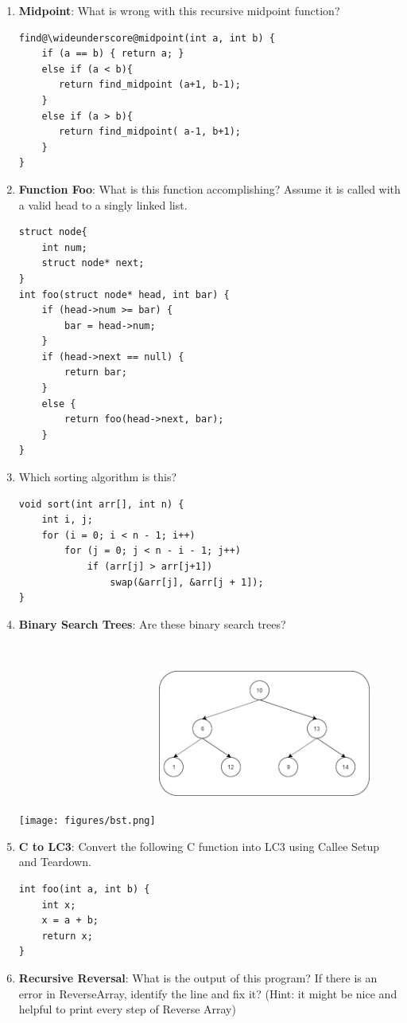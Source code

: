 \documentclass{article}
\begin{document}
\begin{enumerate}[label=(\alph*), itemsep = 120pt]
    \item \textbf{Midpoint}: What is wrong with this recursive midpoint function?
\begin{lstlisting}[style=CStyle] 
find@\wideunderscore@midpoint(int a, int b) {
    if (a == b) { return a; }
    else if (a < b){
       return find_midpoint (a+1, b-1);
    } 
    else if (a > b){
       return find_midpoint( a-1, b+1); 
    } 
}\end{lstlisting}  
    \newpage
    \item \textbf{Function Foo}: What is this function accomplishing? Assume it is called with a valid head to a singly linked list.
\begin{lstlisting}[style=CStyle] 
struct node{
    int num;
    struct node* next;
}
int foo(struct node* head, int bar) {
    if (head->num >= bar) {
        bar = head->num;
    }
    if (head->next == null) {
        return bar;
    }
    else {
        return foo(head->next, bar);
    }
}\end{lstlisting}  
    \item Which sorting algorithm is this?
\begin{lstlisting}[style=CStyle]
void sort(int arr[], int n) {
    int i, j;
    for (i = 0; i < n - 1; i++)
        for (j = 0; j < n - i - 1; j++)
            if (arr[j] > arr[j+1])
                swap(&arr[j], &arr[j + 1]);
}\end{lstlisting}

    \newpage
    \item \textbf{Binary Search Trees}: Are these binary search trees?
    
    \texttt{[image: figures/bst.png]}
    \includegraphics[width=7cm,height=6cm]{figures/notbst.png}
    
    \item \textbf{C to LC3}: Convert the following C function into LC3 using Callee Setup and Teardown.
    \begin{lstlisting}[style=CStyle] 
int foo(int a, int b) {
    int x;
    x = a + b;
    return x;
}\end{lstlisting}
    \newpage
    \item \textbf{Recursive Reversal}: What is the output of this program? If there is an error in ReverseArray, identify the line and fix it? (Hint: it might be nice and helpful to print every step of Reverse Array)
    

\end{enumerate}
\end{document}
